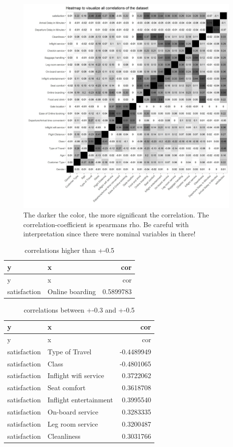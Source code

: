 \documentclass[
]{article}
\begin{document}
\begin{figure}
  \includegraphics{..//plots//heatmap.jpg}
  \caption{The darker the color, the more significant the correlation. The correlation-coefficient is spearmans rho. Be careful with interpretation since there were nominal variables in there!}\label{fig:foobar}
\end{figure}

\begin{longtable}[]{@{}llr@{}}
\caption{correlations higher than +-0.5}\tabularnewline
\toprule
y & x & cor\tabularnewline
\midrule
\endfirsthead
\toprule
y & x & cor\tabularnewline
\midrule
\endhead
satisfaction & Online boarding & 0.5899783\tabularnewline
\bottomrule
\end{longtable}

\begin{longtable}[]{@{}llr@{}}
\caption{correlations between +-0.3 and +-0.5}\tabularnewline
\toprule
y & x & cor\tabularnewline
\midrule
\endfirsthead
\toprule
y & x & cor\tabularnewline
\midrule
\endhead
satisfaction & Type of Travel & -0.4489949\tabularnewline
satisfaction & Class & -0.4801065\tabularnewline
satisfaction & Inflight wifi service & 0.3722062\tabularnewline
satisfaction & Seat comfort & 0.3618708\tabularnewline
satisfaction & Inflight entertainment & 0.3995540\tabularnewline
satisfaction & On-board service & 0.3283335\tabularnewline
satisfaction & Leg room service & 0.3200487\tabularnewline
satisfaction & Cleanliness & 0.3031766\tabularnewline
\bottomrule
\end{longtable}
\end{document}
